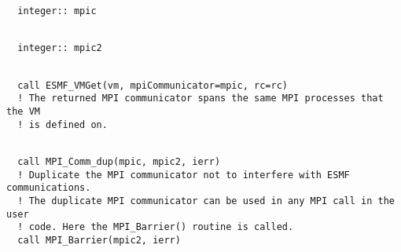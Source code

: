 
 \begin{verbatim}
  integer:: mpic
 
\end{verbatim}
 

 \begin{verbatim}
  integer:: mpic2
 
\end{verbatim}
 

 \begin{verbatim}
  call ESMF_VMGet(vm, mpiCommunicator=mpic, rc=rc)
  ! The returned MPI communicator spans the same MPI processes that the VM
  ! is defined on.
 
\end{verbatim}
 

 \begin{verbatim}
  call MPI_Comm_dup(mpic, mpic2, ierr)
  ! Duplicate the MPI communicator not to interfere with ESMF communications.
  ! The duplicate MPI communicator can be used in any MPI call in the user
  ! code. Here the MPI_Barrier() routine is called.
  call MPI_Barrier(mpic2, ierr)
 
\end{verbatim}

\setlength{\parskip}{\oldparskip}
\setlength{\parindent}{\oldparindent}
\setlength{\baselineskip}{\oldbaselineskip}
